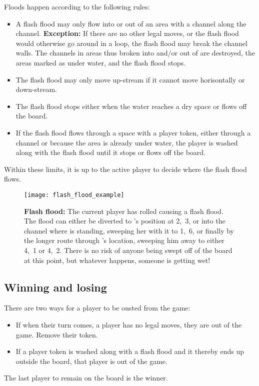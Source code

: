 Floods happen according to the following rules:
\begin{itemize}
    \item A flash flood may only flow into or out of an area with a channel
        along the channel. \textbf{Exception:} If there are no other legal
        moves, or the flash flood would otherwise go around in a loop, the
        flash flood may break the channel walls. The channels in areas thus
        broken into and/or out of are destroyed, the areas marked as under
        water, and the flash flood stops.
    \item The flash flood may only move up-stream if it cannot move
        horisontally or down-stream.
    \item The flash flood stops either when the water reaches a dry space or
        flows off the board.
    \item If the flash flood flows through a space with a player token, either
        through a channel or because the area is already under water, the
        player is washed along with the flash flood until it stops or flows off
        the board.
\end{itemize}
Within these limits, it is up to the active player to decide where the flash
flood flows.

\begin{figure}[t]
    \centering
    \texttt{[image: flash\_flood\_example]}
    \caption{\textbf{Flash flood:} The current player has rolled  
        causing a flash flood. The flood can either be diverted to \Xing{}'s
        position at 2,~3, or into the channel where \Kim{} is standing,
        sweeping her with it to 1,~6, or finally by the longer route through
        \Rufus{}'s location, sweeping him away to either 4,~1 or 4,~2. There is
        no risk of anyone being swept off of the board at this point, but
        whatever happens, someone is getting wet!}
    \label{fig:flash_flood_example}
\end{figure}

\subsection{Winning and losing}
There are two ways for a player to be ousted from the game:
\begin{itemize}
    \item If when their turn comes, a player has no legal moves, they are out
        of the game. Remove their token.
    \item If a player token is washed along with a flash flood and it thereby
        ends up outside the board, that player is out of the game.
\end{itemize}
The last player to remain on the board is the winner.


